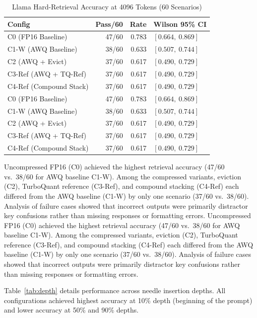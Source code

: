 \documentclass[sigconf,nonacm]{acmart}
\begin{document}
\begin{table}[htbp]
\caption{Llama Hard-Retrieval Accuracy at 4096 Tokens (60 Scenarios)}
\label{tab:llama-quality}
\centering\small
\begin{tabular}{lrrl}
\toprule
\textbf{Config} & \textbf{Pass/60} & \textbf{Rate} & \textbf{Wilson 95\% CI} \\
\midrule
C0 (FP16 Baseline)      & 47/60 & 0.783 & $[0.664,\ 0.869]$ \\
C1-W (AWQ Baseline)     & 38/60 & 0.633 & $[0.507,\ 0.744]$ \\
C2 (AWQ + Evict)        & 37/60 & 0.617 & $[0.490,\ 0.729]$ \\
C3-Ref (AWQ + TQ-Ref)   & 37/60 & 0.617 & $[0.490,\ 0.729]$ \\
C4-Ref (Compound Stack) & 37/60 & 0.617 & $[0.490,\ 0.729]$ \\
C0 (FP16 Baseline)      & 47/60 & 0.783 & $[0.664,\ 0.869]$ \\
C1-W (AWQ Baseline)     & 38/60 & 0.633 & $[0.507,\ 0.744]$ \\
C2 (AWQ + Evict)        & 37/60 & 0.617 & $[0.490,\ 0.729]$ \\
C3-Ref (AWQ + TQ-Ref)   & 37/60 & 0.617 & $[0.490,\ 0.729]$ \\
C4-Ref (Compound Stack) & 37/60 & 0.617 & $[0.490,\ 0.729]$ \\
\bottomrule
\end{tabular}
\end{table}

\begingroup\raggedright
Uncompressed FP16 (C0) achieved the highest retrieval accuracy (47/60 vs.\ 38/60 for AWQ baseline C1-W). Among the compressed variants, eviction (C2), TurboQuant reference (C3-Ref), and compound stacking (C4-Ref) each differed from the AWQ baseline (C1-W) by only one scenario (37/60 vs.\ 38/60). Analysis of failure cases showed that incorrect outputs were primarily distractor key confusions rather than missing responses or formatting errors.
Uncompressed FP16 (C0) achieved the highest retrieval accuracy (47/60 vs.\ 38/60 for AWQ baseline C1-W). Among the compressed variants, eviction (C2), TurboQuant reference (C3-Ref), and compound stacking (C4-Ref) each differed from the AWQ baseline (C1-W) by only one scenario (37/60 vs.\ 38/60). Analysis of failure cases showed that incorrect outputs were primarily distractor key confusions rather than missing responses or formatting errors.
\par\endgroup

Table~\ref{tab:depth} details performance across needle insertion depths. All configurations achieved highest accuracy at 10\% depth (beginning of the prompt) and lower accuracy at 50\% and 90\% depths.
\end{document}
